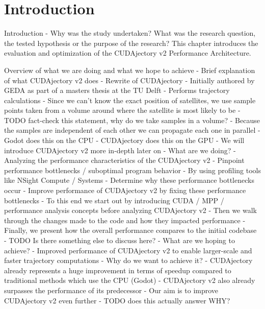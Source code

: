 \chapter{Introduction}
Introduction - Why was the study undertaken? What was the research question, the tested hypothesis or the purpose of the research?
This chapter introduces the evaluation and optimization of the CUDAjectory v2 Performance Architecture.


Overview of what we are doing and what we hope to achieve
- Brief explanation of what CUDAjectory v2 does
  - Rewrite of CUDAjectory
  - Initially authored by GEDA as part of a masters thesis at the TU Delft
  - Performs trajectory calculations
    - Since we can't know the exact position of satellites, we use sample points taken from a volume around where the satellite is most likely to be
      - TODO fact-check this statement, why do we take samples in a volume?
    - Because the samples are independent of each other we can propagate each one in parallel
    - Godot does this on the CPU
    - CUDAjectory does this on the GPU
    - We will introduce CUDAjectory v2 more in-depth later on
- What are we doing?
  - Analyzing the performance characteristics of the CUDAjectory v2
    - Pinpoint performance bottlenecks / suboptimal program behavior
      - By using profiling tools like NSight Compute / Systems
    - Determine why these performance bottlenecks occur
  - Improve performance of CUDAjectory v2 by fixing these performance bottlenecks
  - To this end we start out by introducing CUDA / MPP / performance analysis concepts before analyzing CUDAjectory v2
  - Then we walk through the changes made to the code and how they impacted performance
  - Finally, we present how the overall performance compares to the initial codebase
  - TODO Is there something else to discuss here?
- What are we hoping to achieve?
  - Improved performance of CUDAjectory v2 to enable larger-scale and faster trajectory computations
- Why do we want to achieve it?
  - CUDAjectory already represents a huge improvement in terms of speedup compared to traditional methods which use the CPU (Godot)
  - CUDAjectory v2 also already surpasses the performance of its predecessor
  - Our aim is to improve CUDAjectory v2 even further
  - TODO does this actually answer WHY?

